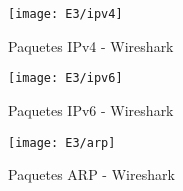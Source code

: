 \begin{figure}[h!] 
\centering    
\texttt{[image: E3/ipv4]}
\caption[Paquetes IPv4 - Wireshark]{Paquetes IPv4 - Wireshark}
\label{fig:CapturaTCP}
\end{figure}

\newpage
\begin{figure}[ht!] 
\centering    
\texttt{[image: E3/ipv6]}
\caption[CPaquetes IPv6 - Wireshark]{Paquetes IPv6 - Wireshark}
\label{fig:CapturaTCP}
\end{figure}

\begin{figure}[h!] 
\centering    
\texttt{[image: E3/arp]}
\caption[Paquetes ARP - Wireshark]{Paquetes ARP - Wireshark}
\label{fig:CapturaTCP}
\end{figure}